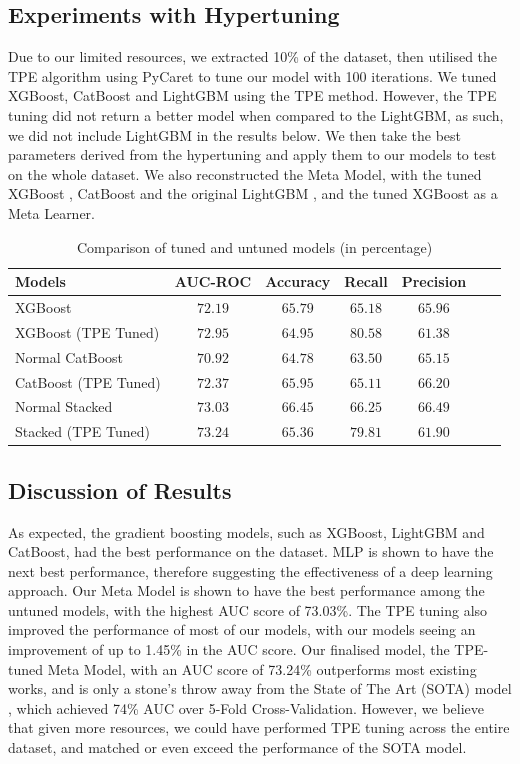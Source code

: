 \documentclass[pdflatex,sn-basic,Numbered]{sn-jnl}%
\theoremstyle{thmstyleone}%
\theoremstyle{thmstyletwo}%
\theoremstyle{thmstylethree}%
\begin{document}
\subsection{Experiments with Hypertuning}
Due to our limited resources, we extracted 10\% of the dataset, then utilised the TPE algorithm using PyCaret \cite{pycaret} to tune our model with 100 iterations. We tuned XGBoost, CatBoost and LightGBM using the TPE method. However, the TPE tuning did not return a better model when compared to the LightGBM, as such, we did not include LightGBM in the results below. We then take the best parameters derived from the hypertuning and apply them to our models to test on the whole dataset. We also reconstructed the Meta Model, with the tuned XGBoost \cite{Chen:2016:XST:2939672.2939785}, CatBoost \cite{cat} and the original LightGBM \cite{ke2017lightgbm}, and the tuned XGBoost as a Meta Learner. 
\begin{table}
\centering
\caption{Comparison of tuned and untuned models (in percentage)}
\label{tab:allaimodels}
\begin{tabular}{@{}lcccccc@{}}
\toprule %
 {\bf Models} & {\bf AUC-ROC} & {\bf Accuracy} & {\bf Recall} & {\bf Precision} \\ \midrule %
XGBoost & $72.19$ & $65.79$ & $65.18$ & $65.96$ \\ %
 XGBoost (TPE Tuned) & $72.95$ & $64.95$ & $\mathbf{80.58}$ & $61.38$ \\ \hline
Normal CatBoost & $70.92$ & $64.78$ & $63.50$ & $65.15$ \\ %
 CatBoost (TPE Tuned) & $72.37$ & $65.95$ & $65.11$ & $66.20$ \\ \hline
 Normal Stacked & $73.03$ & $\mathbf{66.45}$ & $66.25$ & $\mathbf{66.49}$ \\ %
 Stacked (TPE Tuned) & $\mathbf{73.24}$ & $65.36$ & $79.81$ & $61.90$ \\ \bottomrule %
\end{tabular}%
\vspace{-2ex}
\end{table}

\subsection{Discussion of Results}
As expected, the gradient boosting models, such as XGBoost, LightGBM and CatBoost, had the best performance on the dataset. MLP is shown to have the next best performance, therefore suggesting the effectiveness of a deep learning approach. Our Meta Model is shown to have the best performance among the untuned models, with the highest AUC score of 73.03\%. The TPE tuning also improved the performance of most of our models, with our models seeing an improvement of up to 1.45\% in the AUC score. Our finalised model, the TPE-tuned Meta Model, with an AUC score of 73.24\% outperforms most existing works, and is only a stone's throw away from the State of The Art (SOTA) model \cite{shahini2019}, which achieved 74\% AUC over 5-Fold Cross-Validation. However, we believe that given more resources, we could have performed TPE tuning across the entire dataset, and matched or even exceed the performance of the SOTA model. 
\end{document}
